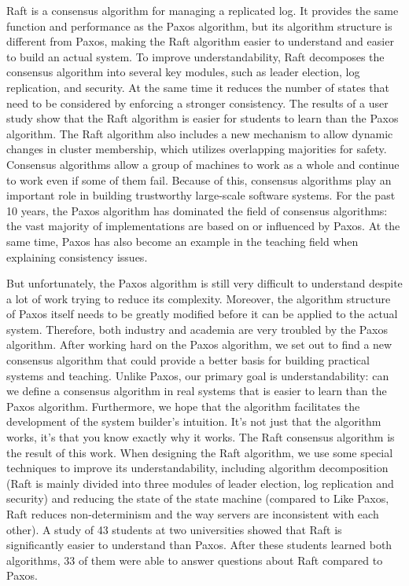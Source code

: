 
Raft is a consensus algorithm for managing a replicated log. It provides the same function and performance as the Paxos algorithm, but its algorithm structure is different from Paxos, making the Raft algorithm easier to understand and easier to build an actual system. To improve understandability, Raft decomposes the consensus algorithm into several key modules, such as leader election, log replication, and security. At the same time it reduces the number of states that need to be considered by enforcing a stronger consistency. The results of a user study show that the Raft algorithm is easier for students to learn than the Paxos algorithm. The Raft algorithm also includes a new mechanism to allow dynamic changes in cluster membership, which utilizes overlapping majorities for safety.
Consensus algorithms allow a group of machines to work as a whole and continue to work even if some of them fail. Because of this, consensus algorithms play an important role in building trustworthy large-scale software systems. For the past 10 years, the Paxos algorithm has dominated the field of consensus algorithms: the vast majority of implementations are based on or influenced by Paxos. At the same time, Paxos has also become an example in the teaching field when explaining consistency issues.

But unfortunately, the Paxos algorithm is still very difficult to understand despite a lot of work trying to reduce its complexity. Moreover, the algorithm structure of Paxos itself needs to be greatly modified before it can be applied to the actual system. Therefore, both industry and academia are very troubled by the Paxos algorithm.
After working hard on the Paxos algorithm, we set out to find a new consensus algorithm that could provide a better basis for building practical systems and teaching. Unlike Paxos, our primary goal is understandability: can we define a consensus algorithm in real systems that is easier to learn than the Paxos algorithm. Furthermore, we hope that the algorithm facilitates the development of the system builder's intuition. It's not just that the algorithm works, it's that you know exactly why it works.
The Raft consensus algorithm is the result of this work. When designing the Raft algorithm, we use some special techniques to improve its understandability, including algorithm decomposition (Raft is mainly divided into three modules of leader election, log replication and security) and reducing the state of the state machine (compared to Like Paxos, Raft reduces non-determinism and the way servers are inconsistent with each other). A study of 43 students at two universities showed that Raft is significantly easier to understand than Paxos. After these students learned both algorithms, 33 of them were able to answer questions about Raft compared to Paxos.

